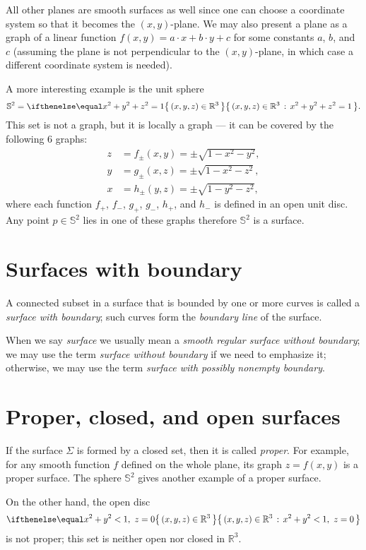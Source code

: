 All other planes are smooth surfaces as well since one can choose a coordinate system so that it becomes the $(x,y)$-plane.
We may also present a plane as a graph of a linear function 
$f(x,y)=a\cdot x+b\cdot y+c$ for some constants $a$, $b$, and $c$
(assuming the plane is not perpendicular to the $(x,y)$-plane, in which case a different coordinate system is needed).

A more interesting example is the unit sphere 
\[\mathbb{S}^2=\set{(x,y,z)\in\mathbb{R}^3}{x^2+y^2+z^2=1}.\]
This set is not a graph,
but it is locally a graph ---
it can be covered by the following 6 graphs:
\begin{align*}
z&=f_\pm(x,y)=\pm \sqrt{1-x^2-y^2},
\\
y&=g_\pm(x,z)=\pm \sqrt{1-x^2-z^2},
\\
x&=h_\pm(y,z)=\pm \sqrt{1-y^2-z^2},
\end{align*}
where each function $f_+$, $f_-$, $g_+$, $g_-$, $h_+$, and $h_-$ is defined in an open unit disc.
Any point $p\in\mathbb{S}^2$ lies in one of these graphs therefore $\mathbb{S}^2$ is a surface.

\section{Surfaces with boundary}
A connected subset in a surface that is bounded by one or more 
curves is called a \emph{surface with boundary}; such curves form the \emph{boundary line} of the surface.

When we say {}\emph{surface} we usually mean a {}\emph{smooth regular surface without boundary};
we may use the term {}\emph{surface without boundary} if we need to emphasize it;
otherwise, we may use the term {}\emph{surface with possibly nonempty boundary}.

\section{Proper, closed, and open surfaces}
If the surface $\Sigma$ is formed by a closed set, then it is called \emph{proper}.
For example, for any smooth function $f$ defined on the whole plane, its graph $z=f(x,y)$ is a proper surface.
The sphere $\mathbb{S}^2$ gives another example of a proper surface.

On the other hand, the open disc 
\[\set{(x,y,z)\in\mathbb{R}^3}{x^2+y^2<1,\  z=0}\]
is not proper; this set is neither open nor closed in $\mathbb{R}^3$.

